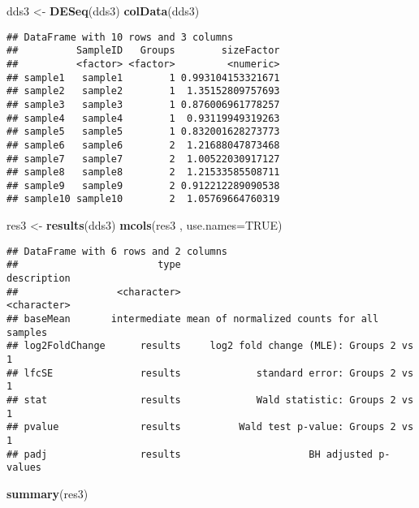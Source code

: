\documentclass[]{article}
\newenvironment{Shaded}{\begin{snugshade}}{\end{snugshade}}
\newcommand{\DataTypeTok}[1]{\textcolor[rgb]{0.13,0.29,0.53}{#1}}
\newcommand{\KeywordTok}[1]{\textcolor[rgb]{0.13,0.29,0.53}{\textbf{#1}}}
\newcommand{\NormalTok}[1]{#1}
\newcommand{\OtherTok}[1]{\textcolor[rgb]{0.56,0.35,0.01}{#1}}
\newcommand{\StringTok}[1]{\textcolor[rgb]{0.31,0.60,0.02}{#1}}
\begin{document}
\begin{Shaded}
\begin{Highlighting}[]
\NormalTok{dds3 <-}\StringTok{ }\KeywordTok{DESeq}\NormalTok{(dds3)}
\KeywordTok{colData}\NormalTok{(dds3)}
\end{Highlighting}
\end{Shaded}

\begin{verbatim}
## DataFrame with 10 rows and 3 columns
##          SampleID   Groups        sizeFactor
##          <factor> <factor>         <numeric>
## sample1   sample1        1 0.993104153321671
## sample2   sample2        1  1.35152809757693
## sample3   sample3        1 0.876006961778257
## sample4   sample4        1  0.93119949319263
## sample5   sample5        1 0.832001628273773
## sample6   sample6        2  1.21688047873468
## sample7   sample7        2  1.00522030917127
## sample8   sample8        2  1.21533585508711
## sample9   sample9        2 0.912212289090538
## sample10 sample10        2  1.05769664760319
\end{verbatim}

\begin{Shaded}
\begin{Highlighting}[]
\NormalTok{res3 <-}\StringTok{ }\KeywordTok{results}\NormalTok{(dds3)}
\KeywordTok{mcols}\NormalTok{(res3 , }\DataTypeTok{use.names=}\OtherTok{TRUE}\NormalTok{)}
\end{Highlighting}
\end{Shaded}

\begin{verbatim}
## DataFrame with 6 rows and 2 columns
##                        type                               description
##                 <character>                               <character>
## baseMean       intermediate mean of normalized counts for all samples
## log2FoldChange      results     log2 fold change (MLE): Groups 2 vs 1
## lfcSE               results             standard error: Groups 2 vs 1
## stat                results             Wald statistic: Groups 2 vs 1
## pvalue              results          Wald test p-value: Groups 2 vs 1
## padj                results                      BH adjusted p-values
\end{verbatim}

\begin{Shaded}
\begin{Highlighting}[]
\KeywordTok{summary}\NormalTok{(res3)}
\end{Highlighting}
\end{Shaded}
\end{document}

